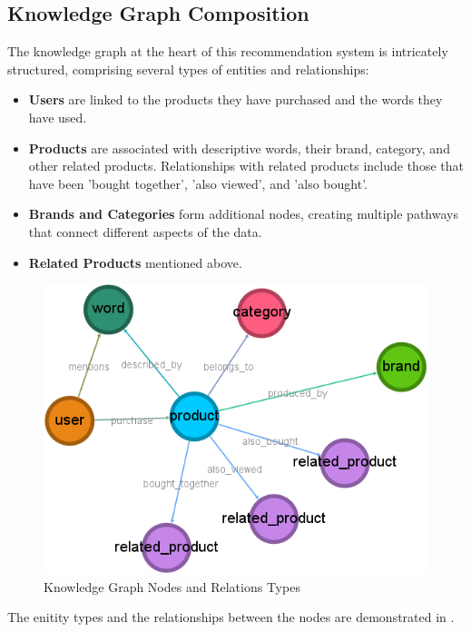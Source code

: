 \subsection{Knowledge Graph Composition}
The knowledge graph at the heart of this recommendation system is intricately structured,
comprising several types of entities and relationships:
\begin{itemize}
	\item \textbf{Users} are linked to the products
	      they have purchased and the words they have used.

	\item \textbf{Products} are associated with descriptive words, their brand,
	      category, and other related products. Relationships with related products
	      include those that have been 'bought together', 'also viewed', and 'also bought'.

	\item \textbf{Brands and Categories} form additional nodes, creating multiple pathways
	      that connect different aspects of the data.

	\item \textbf{Related Products} mentioned above.
\end{itemize}
\begin{figure}[h!]
	\begin{center}
		\includegraphics[width=0.6\columnwidth, keepaspectratio]{images/knowledge_graph_structure.png}
		\caption{Knowledge Graph Nodes and Relations Types}
		\label{fig:knowledge_graph_structure}
	\end{center}
\end{figure}
The enitity types and the relationships between the nodes are demonstrated in
.

